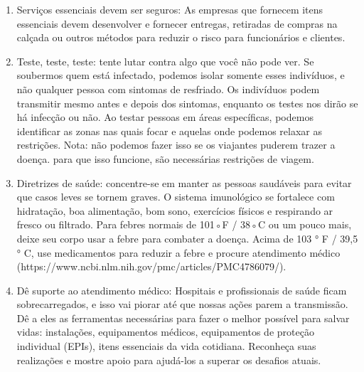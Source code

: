 \documentclass[onecolumn,journal]{IEEEtran}
\begin{document}
\begin{multicols}{2}
\begin{enumerate}
    \item Serviços essenciais devem ser seguros: As empresas que fornecem itens essenciais devem desenvolver e fornecer entregas, retiradas de compras na calçada ou outros métodos para reduzir o risco para funcionários e clientes.
    \item Teste, teste, teste: tente lutar contra algo que você não pode ver. Se soubermos quem está infectado, podemos isolar somente esses indivíduos, e não qualquer pessoa com sintomas de resfriado. Os indivíduos podem transmitir mesmo antes e depois dos sintomas, enquanto os testes nos dirão se há infecção ou não. Ao testar pessoas em áreas específicas, podemos identificar as zonas nas quais focar e aquelas onde podemos relaxar as restrições. Nota: não podemos fazer isso se os viajantes puderem trazer a doença. para que isso funcione, são necessárias restrições de viagem.
    \item Diretrizes de saúde: concentre-se em manter as pessoas saudáveis para evitar que casos leves se tornem graves. O sistema imunológico se fortalece com hidratação, boa alimentação, bom sono, exercícios físicos e respirando ar fresco ou filtrado. Para febres normais de 101◦F / 38◦C ou um pouco mais, deixe seu corpo usar a febre para combater a doença. Acima de 103 ° F / 39,5 ° C, use medicamentos para reduzir a febre e procure atendimento médico (https://www.ncbi.nlm.nih.gov/pmc/articles/PMC4786079/).
\item Dê suporte ao atendimento médico: Hospitais e profissionais de saúde ficam sobrecarregados, e isso vai piorar até que nossas ações parem a transmissão. Dê a eles as ferramentas necessárias para fazer o melhor possível para salvar vidas: instalações, equipamentos médicos, equipamentos de proteção individual (EPIs), itens essenciais da vida cotidiana. Reconheça suas realizações e mostre apoio para ajudá-los a superar os desafios atuais.
\end{enumerate}

\end{multicols}


% 

\end{document}
